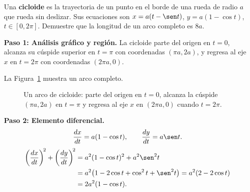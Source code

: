 \begin{example}
Una \textbf{cicloide} es la trayectoria de un punto en el borde de una rueda
de radio $a$ que rueda sin deslizar. Sus ecuaciones son
$x = a(t - \sen t)$, $y = a(1 - \cos t)$, $t \in [0, 2\pi]$.
Demuestre que la longitud de un arco completo es $8a$.

\begin{myproof}

\textbf{Paso 1: Análisis gráfico y región.}
La cicloide parte del origen en $t=0$, alcanza su cúspide superior en
$t = \pi$ con coordenadas $(\pi a, 2a)$, y regresa al eje $x$ en
$t = 2\pi$ con coordenadas $(2\pi a, 0)$.

La Figura~\ref{fig:cicloide} muestra un arco completo.

\begin{figure}[H]
\centering
{}
\caption{Un arco de cicloide: parte del origen en $t=0$, alcanza la cúspide $(\pi a,2a)$ en $t=\pi$ y regresa al eje $x$ en $(2\pi a,0)$ cuando $t=2\pi$.}
\label{fig:cicloide}
\end{figure}

\textbf{Paso 2: Elemento diferencial.}
\[
  \frac{dx}{dt} = a(1 - \cos t), \qquad
  \frac{dy}{dt} = a\sen t.
\]
\begin{align*}
  \left(\frac{dx}{dt}\right)^{\!2}
  + \left(\frac{dy}{dt}\right)^{\!2}
  &= a^2(1-\cos t)^2 + a^2\sen^2 t \\
  &= a^2\bigl(1 - 2\cos t + \cos^2 t + \sen^2 t\bigr)
   = a^2(2 - 2\cos t)\\
  &= 2a^2(1 - \cos t).
\end{align*}


\end{myproof}
\end{example}

